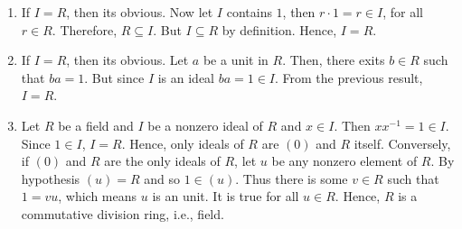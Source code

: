 \begin{propproof}
    \begin{enumerate}
        \item If $I = R$, then its obvious. Now let $I$ contains $1$, then $r \cdot 1 = r \in I$, for all $r \in R$. Therefore, $R \subseteq I$. But $I \subseteq R$ by definition. Hence, $I = R$.
        \item If $I = R$, then its obvious. Let $a$ be a unit in $R$. Then, there exits $b \in R$ such that $ba = 1$. But since $I$ is an ideal $ba = 1 \in I$. From the previous result, $I = R$.
        \item Let $R$ be a field and $I$ be a nonzero ideal of $R$ and $x \in I$. Then $x x^{-1} = 1 \in I$. Since $1 \in I$, $I = R$. Hence, only ideals of $R$ are $(0)$ and $R$ itself. Conversely, if $(0)$ and $R$ are the only ideals of $R$, let $u$ be any nonzero element of $R$. By hypothesis $(u) = R$ and so $1 \in (u)$. Thus there is some $v \in R$ such that $1 = vu$, which means $u$ is an unit. It is true for all $u \in R$. Hence, $R$ is a commutative division ring, i.e., field. 
    \end{enumerate}
\end{propproof}
